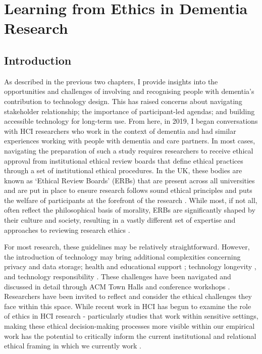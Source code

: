 \chapter{Learning from Ethics in Dementia Research}
\label{EthicsChapter}

\section{Introduction}
\label{Ethics:Intro}
As described in the previous two chapters, I provide insights into the opportunities and challenges of involving and recognising people with dementia's contribution to technology design. This has raised concerns about navigating stakeholder relationship; the importance of participant-led agendas; and building accessible technology for long-term use. From here, in 2019, I began conversations with HCI researchers who work in the context of dementia and had similar experiences working with people with dementia and care partners. In most cases, navigating the preparation of such a study requires researchers to receive ethical approval from institutional ethical review boards that define ethical practices through a set of institutional ethical procedures. In the UK, these bodies are known as ‘Ethical Review Boards’ (ERBs) that are present across all universities and are put in place to ensure research follows sound ethical principles and puts the welfare of participants at the forefront of the research \citep{pachana_can_2014}. While most, if not all, often reflect the philosophical basis of morality, ERBs are significantly shaped by their culture and society, resulting in a vastly different set of expertise and approaches to reviewing research ethics \citep{flicker_ethical_2007}.

For most research, these guidelines may be relatively straightforward. However, the introduction of technology may bring additional complexities concerning privacy and data storage; health and educational support \citep{gray2016inscribing}; technology longevity \citep{foley_printer_2019}, and technology responsibility \citep{ferrario_software_2014}. These challenges have been navigated and discussed in detail through ACM Town Halls and conference workshops \citep{frauenberger_research_2017,munteanu_sigchi_2019,waycott_ethical_2015}. Researchers have been invited to reflect and consider the ethical challenges they face within this space. While recent work in HCI has begun to examine the role of ethics in HCI research - particularly studies that work within sensitive settings, making these ethical decision-making processes more visible within our empirical work has the potential to critically inform the current institutional and relational ethical framing in which we currently work \citep{oyebode_mental_2005}.

